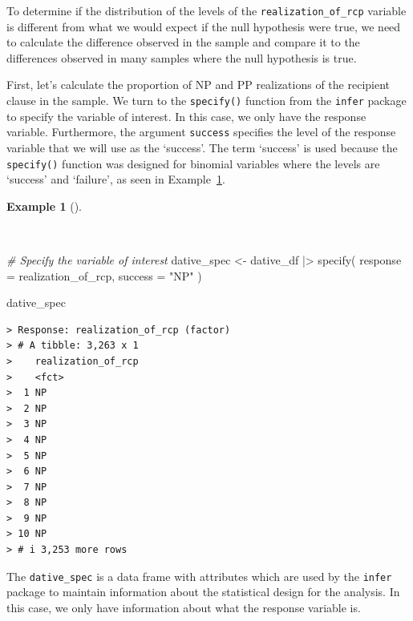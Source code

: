 \documentclass[
  letterpaper,
  DIV=11,
  numbers=noendperiod]{scrreprt}
\newenvironment{Shaded}{\begin{snugshade}}{\end{snugshade}}
\newcommand{\AttributeTok}[1]{\textcolor[rgb]{0.00,0.00,0.00}{#1}}
\newcommand{\CommentTok}[1]{\textcolor[rgb]{0.00,0.00,0.00}{\textit{#1}}}
\newcommand{\FunctionTok}[1]{\textcolor[rgb]{0.00,0.00,0.00}{#1}}
\newcommand{\NormalTok}[1]{\textcolor[rgb]{0.00,0.00,0.00}{#1}}
\newcommand{\OtherTok}[1]{\textcolor[rgb]{0.00,0.00,0.00}{#1}}
\newcommand{\SpecialCharTok}[1]{\textcolor[rgb]{0.00,0.00,0.00}{#1}}
\newcommand{\StringTok}[1]{\textcolor[rgb]{0.00,0.00,0.00}{#1}}
\theoremstyle{definition}
\newtheorem{example}{Example}[chapter]
\theoremstyle{remark}
\begin{document}
To determine if the distribution of the levels of the
\texttt{realization\_of\_rcp} variable is different from what we would
expect if the null hypothesis were true, we need to calculate the
difference observed in the sample and compare it to the differences
observed in many samples where the null hypothesis is true.

First, let's calculate the proportion of NP and PP realizations of the
recipient clause in the sample. We turn to the \texttt{specify()}
function from the \texttt{infer} package to specify the variable of
interest. In this case, we only have the response variable. Furthermore,
the argument \texttt{success} specifies the level of the response
variable that we will use as the `success'. The term `success' is used
because the \texttt{specify()} function was designed for binomial
variables where the levels are `success' and `failure', as seen in
Example~\ref{exm-ida-cat-specify}.

\begin{example}[]\protect\hypertarget{exm-ida-cat-specify}{}\label{exm-ida-cat-specify}

~

\begin{Shaded}
\begin{Highlighting}[]
\CommentTok{\# Specify the variable of interest}
\NormalTok{dative\_spec }\OtherTok{\textless{}{-}}
\NormalTok{  dative\_df }\SpecialCharTok{|\textgreater{}}
  \FunctionTok{specify}\NormalTok{(}
    \AttributeTok{response =}\NormalTok{ realization\_of\_rcp,}
    \AttributeTok{success =} \StringTok{"NP"}
\NormalTok{  )}

\NormalTok{dative\_spec}
\end{Highlighting}
\end{Shaded}

\begin{verbatim}
> Response: realization_of_rcp (factor)
> # A tibble: 3,263 x 1
>    realization_of_rcp
>    <fct>             
>  1 NP                
>  2 NP                
>  3 NP                
>  4 NP                
>  5 NP                
>  6 NP                
>  7 NP                
>  8 NP                
>  9 NP                
> 10 NP                
> # i 3,253 more rows
\end{verbatim}

\end{example}

The \texttt{dative\_spec} is a data frame with attributes which are used
by the \texttt{infer} package to maintain information about the
statistical design for the analysis. In this case, we only have
information about what the response variable is.
\end{document}
